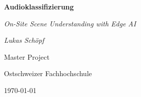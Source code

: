 %
%
%


\begin{titlepage}
    \centering

    {\huge \bfseries \sffamily Audioklassifizierung \par
     \normalfont\itshape On-Site Scene Understanding with Edge AI \par}
    \vspace{1cm}

    {\large \textsl{Lukas Schöpf}}
    \par
    \vspace{1cm}

    {\textsc Master Project \par}
    {Ostschweizer Fachhochschule \par}
    \today
    \vfill
    

    \vfill

        
    \restoregeometry    
\end{titlepage}

